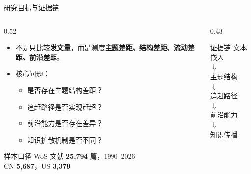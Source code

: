 \documentclass{beamer}
\newcommand{\hi}[1]{\textcolor{njupurple}{\textbf{#1}}}
\begin{document}
\begin{frame}{研究目标与证据链}
    \begin{columns}[T]
        \begin{column}{0.52\linewidth}
            \begin{itemize}
                \item 不是只比较\hi{发文量}，而是测度\hi{主题差距、结构差距、流动差距、前沿差距}。
                \item 核心问题：
                \begin{itemize}
                    \item 是否存在主题结构差距？
                    \item 追赶路径是否实现赶超？
                    \item 前沿能力是否存在差异？
                    \item 知识扩散机制是否不同？
                \end{itemize}
            \end{itemize}
            \begin{block}{样本口径}
                WoS 文献 \hi{25,794} 篇，1990--2026\\
                CN \hi{5,687}，US \hi{3,379}
            \end{block}
        \end{column}
        \begin{column}{0.43\linewidth}
            \begin{block}{证据链}
                文本嵌入\\
                \quad $\Downarrow$\\
                主题结构\\
                \quad $\Downarrow$\\
                追赶路径\\
                \quad $\Downarrow$\\
                前沿能力\\
                \quad $\Downarrow$\\
                知识传播
            \end{block}
        \end{column}
    \end{columns}
    \vspace{0.3em}
\end{frame}
\end{document}
